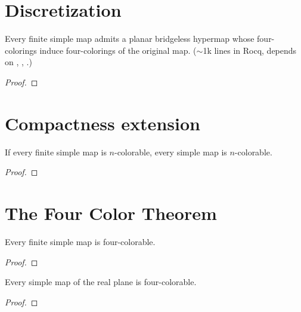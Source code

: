 \chapter{Discretization}


\begin{theorem}
  \label{thm:discretize-to-hypermap}
  \leanok
  Every finite simple map admits a planar bridgeless hypermap whose
  four-colorings induce four-colorings of the original map. ($\sim$1k
  lines in Rocq, depends on , , .)
\end{theorem}
\begin{proof}\notready\end{proof}

\chapter{Compactness extension}


\begin{theorem}
  \label{thm:compactness-extension}
  \leanok
  If every finite simple map is $n$-colorable, every simple map is
  $n$-colorable.
\end{theorem}
\begin{proof}\notready\end{proof}

\chapter{The Four Color Theorem}


\begin{theorem}
  \label{thm:four-color-finite}
  \leanok
  Every finite simple map is four-colorable.
\end{theorem}
\begin{proof}\leanok\end{proof}

\begin{theorem}
  \label{thm:four-color}
  \leanok
  Every simple map of the real plane is four-colorable.
\end{theorem}
\begin{proof}\leanok\end{proof}
